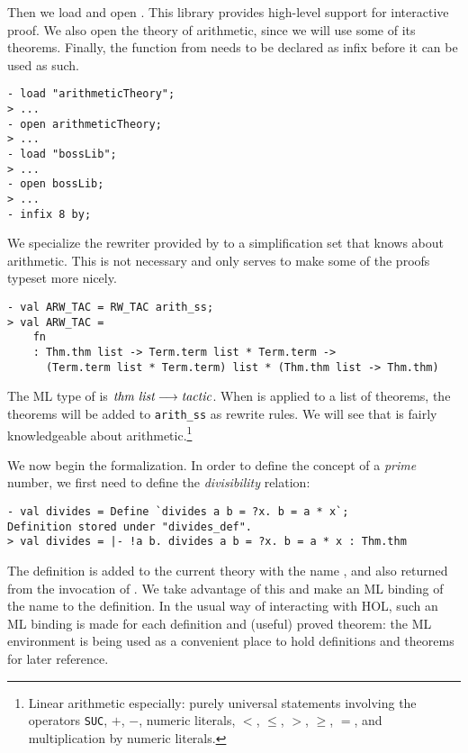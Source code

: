 Then we load and open . This library provides high-level
support for interactive proof.  We also open the theory of arithmetic,
since we will use some of its theorems.  Finally, the function 
from  needs to be declared as infix before it can be used
as such.

\begin{session}
\begin{verbatim}
- load "arithmeticTheory";
> ...
- open arithmeticTheory;
> ...
- load "bossLib";
> ...
- open bossLib;
> ...
- infix 8 by;
\end{verbatim}
\end{session}
We specialize the rewriter provided by  to a
simplification set that knows about arithmetic.  This is not necessary
and only serves to make some of the proofs typeset more nicely.
\begin{session}
\begin{verbatim}
- val ARW_TAC = RW_TAC arith_ss;
> val ARW_TAC =
    fn
    : Thm.thm list -> Term.term list * Term.term ->
      (Term.term list * Term.term) list * (Thm.thm list -> Thm.thm)
\end{verbatim}
\end{session}
The ML type of  is $\mbox{\it thm list} \longrightarrow
\mbox{\it tactic}$. When  is applied to a list of theorems, the
theorems will be added to \verb+arith_ss+ as rewrite rules.  We will see
that  is fairly knowledgeable about
arithmetic.\footnote{Linear arithmetic especially: purely universal
statements involving the operators {\tt SUC}, $+$, $-$, numeric
literals, $<$, $\leq$, $>$, $\geq$, $=$, and multiplication by numeric
literals.}

We now begin the formalization. In order to define the concept of a {\it
prime\/} number, we first need to define the {\it divisibility\/}
relation:

\begin{session}\begin{verbatim}
- val divides = Define `divides a b = ?x. b = a * x`;
Definition stored under "divides_def".
> val divides = |- !a b. divides a b = ?x. b = a * x : Thm.thm
\end{verbatim}\end{session}
    The definition is added to the current theory with the name
    , and also returned from the invocation of
    . We take advantage of this and make an ML binding of
    the name  to the definition. In the usual way of
    interacting with HOL, such an ML binding is made for each
    definition and (useful) proved theorem: the ML environment is
    being used as a convenient place to hold definitions and theorems
    for later reference.

